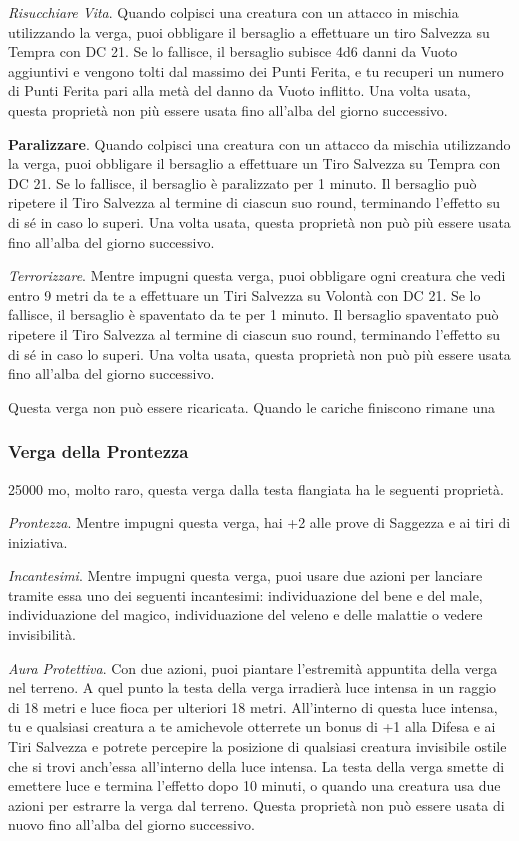 \begin{multicols}{2}
	\textit{Risucchiare Vita}. Quando colpisci una creatura con un attacco in mischia utilizzando la verga, puoi obbligare il bersaglio a effettuare un tiro Salvezza su Tempra con DC 21. Se lo fallisce, il bersaglio subisce 4d6 danni da Vuoto aggiuntivi e vengono tolti dal massimo dei Punti Ferita, e tu recuperi un numero di Punti Ferita pari alla metà del danno da Vuoto inflitto. Una volta usata, questa proprietà non più essere usata fino all'alba del giorno successivo.

	\textbf{Paralizzare}. Quando colpisci una creatura con un attacco da mischia utilizzando la verga, puoi obbligare il bersaglio a effettuare un Tiro Salvezza su Tempra con DC 21. Se lo fallisce, il bersaglio è paralizzato per 1 minuto. Il bersaglio può ripetere il Tiro Salvezza al termine di ciascun suo round, terminando l'effetto su di sé in caso lo superi. Una volta usata, questa proprietà non può più essere usata fino all'alba del giorno successivo.

	\textit{Terrorizzare}. Mentre impugni questa verga, puoi obbligare ogni creatura che vedi entro 9 metri da te a effettuare un Tiri Salvezza su Volontà con DC 21. Se lo fallisce, il bersaglio è spaventato da te per 1 minuto. Il bersaglio spaventato può ripetere il Tiro Salvezza al termine di ciascun suo round, terminando l'effetto su di sé in caso lo superi. Una volta usata, questa proprietà non può più essere usata fino all'alba del giorno successivo.

	Questa verga non può essere ricaricata. Quando le cariche finiscono rimane una

	\subsubsection*{Verga della Prontezza}
	25000 mo, molto raro, questa verga dalla testa flangiata ha le seguenti proprietà.

	\textit{Prontezza}. Mentre impugni questa verga, hai +2 alle prove di Saggezza e ai tiri di iniziativa.

	\textit{Incantesimi}. Mentre impugni questa verga, puoi usare due azioni per lanciare tramite essa uno dei seguenti incantesimi: individuazione del bene e del male, individuazione del magico, individuazione del veleno e delle malattie o vedere invisibilità.

	\textit{Aura Protettiva}. Con due azioni, puoi piantare l'estremità appuntita della verga nel terreno. A quel punto la testa della verga irradierà luce intensa in un raggio di 18 metri e luce fioca per ulteriori 18 metri. All'interno di questa luce intensa, tu e qualsiasi creatura a te amichevole otterrete un bonus di +1 alla Difesa e ai Tiri Salvezza e potrete percepire la posizione di qualsiasi creatura invisibile ostile che si trovi anch'essa all'interno della luce intensa. La testa della verga smette di emettere luce e termina l'effetto dopo 10 minuti, o quando una creatura usa due azioni per estrarre la verga dal terreno. Questa proprietà non può essere usata di nuovo fino all'alba del giorno successivo.


\end{multicols}
